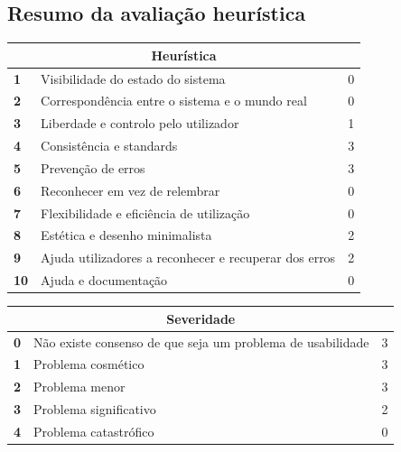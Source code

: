 \documentclass[a4paper,12pt]{article}
\begin{document}
\subsection*{Resumo da avaliação heurística}
    \begin{table}[h!]
        \centering
        \begin{tabular}{|m{0.5cm}|m{12cm}|m{0.5cm}|}
        \hline
        \multicolumn{3}{|c|}{\textbf{Heurística}} \\ \hline
        \textbf{1}  & Visibilidade do estado do sistema                        & 0 \\ \hline
        \textbf{2}  & Correspondência entre o sistema e o mundo real           & 0 \\ \hline
        \textbf{3}  & Liberdade e controlo pelo utilizador                     & 1 \\ \hline
        \textbf{4}  & Consistência e standards                                 & 3 \\ \hline
        \textbf{5}  & Prevenção de erros                                       & 3 \\ \hline
        \textbf{6}  & Reconhecer em vez de relembrar                           & 0 \\ \hline
        \textbf{7}  & Flexibilidade e eficiência de utilização                 & 0 \\ \hline
        \textbf{8}  & Estética e desenho minimalista                           & 2 \\ \hline
        \textbf{9}  & Ajuda utilizadores a reconhecer e recuperar dos erros    & 2 \\ \hline
        \textbf{10} & Ajuda e documentação                                     & 0 \\ \hline
        \end{tabular}
    \end{table}

    \begin{table}[h!]
        \centering
        \begin{tabular}{|m{0.5cm}|m{12cm}|m{0.5cm}|}
        \hline
        \multicolumn{3}{|c|}{\textbf{Severidade}} \\ \hline
        \textbf{0}  & Não existe consenso de que seja um problema de usabilidade   & 3 \\ \hline
        \textbf{1}  & Problema cosmético                                           & 3 \\ \hline
        \textbf{2}  & Problema menor                                               & 3 \\ \hline
        \textbf{3}  & Problema significativo                                       & 2 \\ \hline
        \textbf{4}  & Problema catastrófico                                        & 0 \\ \hline
        \end{tabular}
    \end{table}
\end{document}
